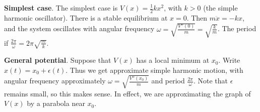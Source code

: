 \documentclass[10pt, a4paper]{article}
\begin{document}
\textbf{Simplest case}.
The simplest case is $V(x) = \frac{1}{2}kx ^ 2$,
with $k > 0$
(the simple harmonic oscillator).
There is a stable equilibrium at $x = 0$.
Then $m\ddot{x} = -kx$,
and the system oscillates with angular frequency $\omega = \sqrt{\frac{V''(0)}{m}} = \sqrt{\frac{k}{m}}$.
The period if $\frac{2\pi}{\omega} = 2\pi\sqrt{\frac{m}{k}}$.

\textbf{General potential}.
Suppose that $V(x)$ has a local minimum at $x_0$.
Write $x(t) = x_0 + \epsilon(t)$.
Thus we get approximate simple harmonic motion,
with angular frequency approximately $\omega = \sqrt{\frac{V''(x_0)}{m}}$ and period $\frac{2\pi}{\omega}$.
Note that $\epsilon$ remains small,
so this makes sense.
In effect,
we are approximating the graph of $V(x)$ by a parabola near $x_0$.
\end{document}
